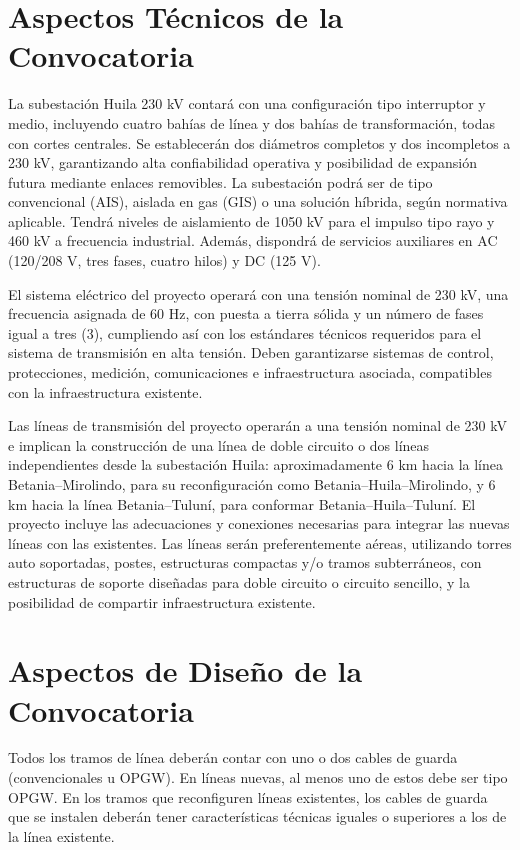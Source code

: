 
\section*{Aspectos Técnicos de la Convocatoria}

La subestación Huila 230 kV contará con una configuración tipo interruptor y medio, incluyendo cuatro bahías de línea y dos bahías de transformación, todas con cortes centrales. Se establecerán dos diámetros completos y dos incompletos a 230 kV, garantizando alta confiabilidad operativa y posibilidad de expansión futura mediante enlaces removibles. La subestación podrá ser de tipo convencional (AIS), aislada en gas (GIS) o una solución híbrida, según normativa aplicable. Tendrá niveles de aislamiento de 1050 kV para el impulso tipo rayo y 460 kV a frecuencia industrial. Además, dispondrá de servicios auxiliares en AC (120/208 V, tres fases, cuatro hilos) y DC (125 V).

El sistema eléctrico del proyecto operará con una tensión nominal de 230 kV, una frecuencia asignada de 60 Hz, con puesta a tierra sólida y un número de fases igual a tres (3), cumpliendo así con los estándares técnicos requeridos para el sistema de transmisión en alta tensión. Deben garantizarse sistemas de control, protecciones, medición, comunicaciones e infraestructura asociada, compatibles con la infraestructura existente.

Las líneas de transmisión del proyecto operarán a una tensión nominal de 230 kV e implican la construcción de una línea de doble circuito o dos líneas independientes desde la subestación Huila: aproximadamente 6 km hacia la línea Betania–Mirolindo, para su reconfiguración como Betania–Huila–Mirolindo, y 6 km hacia la línea Betania–Tuluní, para conformar Betania–Huila–Tuluní. El proyecto incluye las adecuaciones y conexiones necesarias para integrar las nuevas líneas con las existentes. Las líneas serán preferentemente aéreas, utilizando torres auto soportadas, postes, estructuras compactas y/o tramos subterráneos, con estructuras de soporte diseñadas para doble circuito o circuito sencillo, y la posibilidad de compartir infraestructura existente.

\section*{Aspectos de Diseño de la Convocatoria}

Todos los tramos de línea deberán contar con uno o dos cables de guarda (convencionales u OPGW). En líneas nuevas, al menos uno de estos debe ser tipo OPGW. En los tramos que reconfiguren líneas existentes, los cables de guarda que se instalen deberán tener características técnicas iguales o superiores a los de la línea existente.


